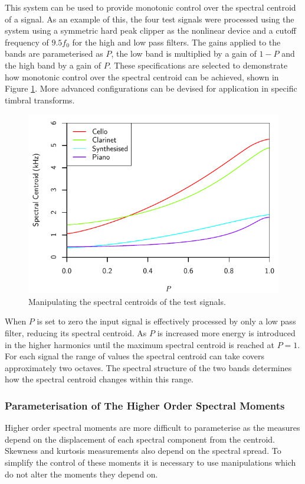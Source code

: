 			This system can be used to provide monotonic control over the spectral centroid of a signal. As an
			example of this, the four test signals were processed using the system using a symmetric hard peak
			clipper as the nonlinear device and a cutoff frequency of $9.5f_{0}$ for the high and low pass
			filters. The gains applied to the bands are parameterised as $P$, the low band is multiplied by a
			gain of $1 - P$ and the high band by a gain of $P$. These specifications are selected to
			demonstrate how monotonic control over the spectral centroid can be achieved, shown in Figure
			\ref{fig:MoveCentroids}. More advanced configurations can be devised for application in specific
			timbral transforms.

			\begin{figure}[h!]
				\centering
				\includegraphics{chapter6/Images/MoveCentroids.pdf}
				\caption{Manipulating the spectral centroids of the test signals.}
				\label{fig:MoveCentroids}
			\end{figure}

			When $P$ is set to zero the input signal is effectively processed by only a low pass filter,
			reducing its spectral centroid. As $P$ is increased more energy is introduced in the higher
			harmonics until the maximum spectral centroid is reached at $P = 1$. For each signal the range of
			values the spectral centroid can take covers approximately two octaves. The spectral structure of
			the two bands determines how the spectral centroid changes within this range.

		\subsubsection*{Parameterisation of The Higher Order Spectral Moments}
			Higher order spectral moments are more difficult to parameterise as the measures depend on the
			displacement of each spectral component from the centroid. Skewness and kurtosis measurements also
			depend on the spectral spread. To simplify the control of these moments it is necessary to use
			manipulations which do not alter the moments they depend on. 
			
